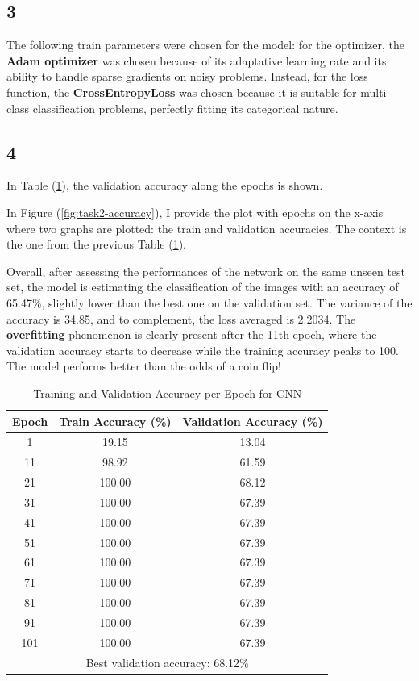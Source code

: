 \documentclass[11pt]{scrartcl}
\begin{document}
\subsection*{3}

The following train parameters were chosen for the model:
for the optimizer, the \textbf{Adam optimizer} was chosen 
because of its adaptative learning rate
and its ability to handle sparse gradients on noisy problems.
Instead, for the loss function, the \textbf{CrossEntropyLoss} was chosen 
because it is suitable for multi-class classification problems,
perfectly fitting its categorical nature.


\subsection*{4}

In Table (\ref{tab:task2-accuracy}),
the validation accuracy along the epochs is shown.

In Figure (\ref{fig:task2-accuracy}), 
I provide the plot with epochs on the x-axis where two graphs are plotted:
the train and validation accuracies.
The context is the one from the previous Table (\ref{tab:task2-accuracy}). 

Overall, after assessing the performances of the network on the same unseen test set,
the model is estimating the classification of the images with an accuracy of 65.47\%, 
slightly lower than the best one on the validation set.
The variance of the accuracy is 34.85, and to complement, the loss averaged is 2.2034.
The \textbf{overfitting} phenomenon is clearly present after the 11th epoch,
where the validation accuracy starts to decrease while the training accuracy peaks to 100.
The model performs better than the odds of a coin flip!

\begin{table}[htbp]
\centering
\caption{Training and Validation Accuracy per Epoch for CNN}
\begin{tabular}{ccc}
\toprule
\textbf{Epoch} & \textbf{Train Accuracy (\%)} & \textbf{Validation Accuracy (\%)} \\
\midrule
1    & 19.15  & 13.04  \\
11   & 98.92  & 61.59  \\
21   & 100.00 & 68.12  \\
31   & 100.00 & 67.39  \\
41   & 100.00 & 67.39  \\
51   & 100.00 & 67.39  \\
61   & 100.00 & 67.39  \\
71   & 100.00 & 67.39  \\
81   & 100.00 & 67.39  \\
91   & 100.00 & 67.39  \\
101  & 100.00 & 67.39  \\
\midrule
\multicolumn{3}{c}{Best validation accuracy: 68.12\%} \\
\bottomrule
\end{tabular}
\label{tab:task2-accuracy}
\end{table}
\end{document}
